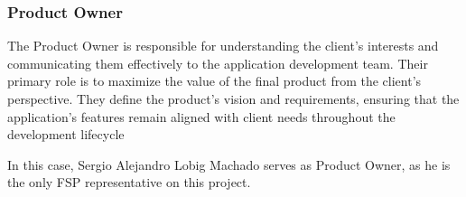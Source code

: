 \subsubsection{Product Owner}

The Product Owner is responsible for understanding the client's interests and communicating them effectively to the application development team. Their primary role is to maximize the value of the final product from the client's perspective. They define the product's vision and requirements, ensuring that the application's features remain aligned with client needs throughout the development lifecycle
 
In this case, Sergio Alejandro Lobig Machado serves as Product Owner, as he is the only FSP representative on this project. 
